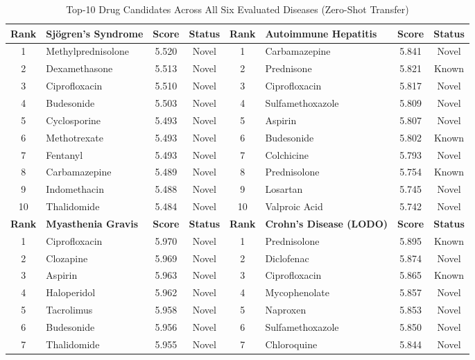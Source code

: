 \documentclass[conference]{IEEEtran}
\begin{document}
\begin{table}[!t]
\caption{Top-10 Drug Candidates Across All Six Evaluated Diseases (Zero-Shot Transfer)}
\label{tab:drug_summary}
\centering
\footnotesize
\renewcommand{\arraystretch}{1.3}
\begin{tabular}{clcc|clcc}
\toprule
\textbf{Rank} & \textbf{Sj\"{o}gren's Syndrome} & \textbf{Score} & \textbf{Status} & \textbf{Rank} & \textbf{Autoimmune Hepatitis} & \textbf{Score} & \textbf{Status} \\
\midrule
1 & Methylprednisolone & 5.520 & Novel & 1 & Carbamazepine & 5.841 & Novel \\
2 & Dexamethasone & 5.513 & Novel & 2 & Prednisone & 5.821 & Known \\
3 & Ciprofloxacin & 5.510 & Novel & 3 & Ciprofloxacin & 5.817 & Novel \\
4 & Budesonide & 5.503 & Novel & 4 & Sulfamethoxazole & 5.809 & Novel \\
5 & Cyclosporine & 5.493 & Novel & 5 & Aspirin & 5.807 & Novel \\
6 & Methotrexate & 5.493 & Novel & 6 & Budesonide & 5.802 & Known \\
7 & Fentanyl & 5.493 & Novel & 7 & Colchicine & 5.793 & Novel \\
8 & Carbamazepine & 5.489 & Novel & 8 & Prednisolone & 5.754 & Known \\
9 & Indomethacin & 5.488 & Novel & 9 & Losartan & 5.745 & Novel \\
10 & Thalidomide & 5.484 & Novel & 10 & Valproic Acid & 5.742 & Novel \\
\midrule
\textbf{Rank} & \textbf{Myasthenia Gravis} & \textbf{Score} & \textbf{Status} & \textbf{Rank} & \textbf{Crohn's Disease (LODO)} & \textbf{Score} & \textbf{Status} \\
\midrule
1 & Ciprofloxacin & 5.970 & Novel & 1 & Prednisolone & 5.895 & Known \\
2 & Clozapine & 5.969 & Novel & 2 & Diclofenac & 5.874 & Novel \\
3 & Aspirin & 5.963 & Novel & 3 & Ciprofloxacin & 5.865 & Known \\
4 & Haloperidol & 5.962 & Novel & 4 & Mycophenolate & 5.857 & Novel \\
5 & Tacrolimus & 5.958 & Novel & 5 & Naproxen & 5.853 & Novel \\
6 & Budesonide & 5.956 & Novel & 6 & Sulfamethoxazole & 5.850 & Novel \\
7 & Thalidomide & 5.955 & Novel & 7 & Chloroquine & 5.844 & Novel \\

\end{tabular}
\end{table}
\end{document}
